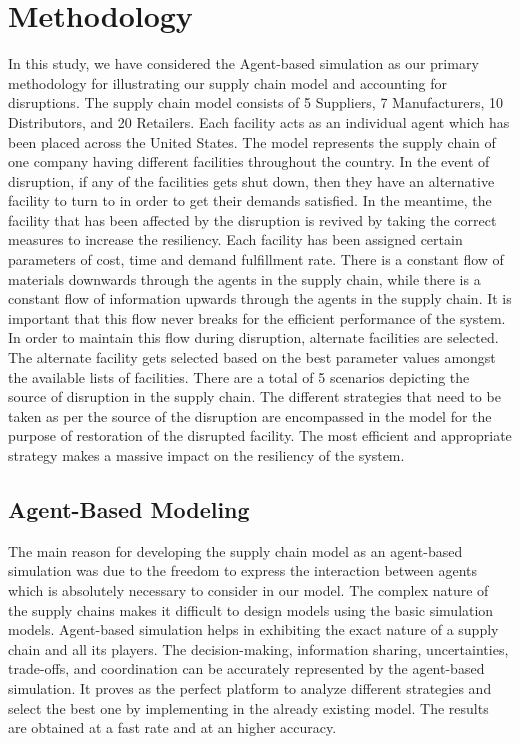 \chapter{Methodology}\label{ch:methodology}

In this study, we have considered the Agent-based simulation as our primary methodology for illustrating our supply chain model and accounting for disruptions. The supply chain model consists of 5 Suppliers, 7 Manufacturers, 10 Distributors, and 20 Retailers. Each facility acts as an individual agent which has been placed across the United States. The model represents the supply chain of one company having different facilities throughout the country. In the event of disruption, if any of the facilities gets shut down, then they have an alternative facility to turn to in order to get their demands satisfied. In the meantime, the facility that has been affected by the disruption is revived by taking the correct measures to increase the resiliency. Each facility has been assigned certain parameters of cost, time and demand fulfillment rate. There is a constant flow of materials downwards through the agents in the supply chain, while there is a constant flow of information upwards through the agents in the supply chain. It is important that this flow never breaks for the efficient performance of the system. In order to maintain this flow during disruption, alternate facilities are selected. The alternate facility gets selected based on the best parameter values amongst the available lists of facilities. There are a total of 5 scenarios depicting the source of disruption in the supply chain. The different strategies that need to be taken as per the source of the disruption are encompassed in the model for the purpose of restoration of the disrupted facility. The most efficient and appropriate strategy makes a massive impact on the resiliency of the system.


\newpage
\section{Agent-Based Modeling}

The main reason for developing the supply chain model as an agent-based simulation was due to the freedom to express the interaction between agents which is absolutely necessary to consider in our model. The complex nature of the supply chains makes it difficult to design models using the basic simulation models. Agent-based simulation helps in exhibiting the exact nature of a supply chain and all its players. The decision-making, information sharing, uncertainties, trade-offs, and coordination can be accurately represented by the agent-based simulation. It proves as the perfect platform to analyze different strategies and select the best one by implementing in the already existing model. The results are obtained at a fast rate and at an higher accuracy. 

